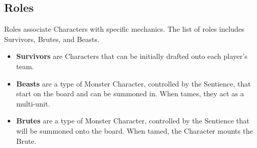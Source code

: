\documentclass[../main.tex]{subfiles}
\begin{document}
\subsection{Roles}
Roles associate Characters with specific mechanics. The list of roles includes Survivors, Brutes, and Beasts. 

\begin{itemize}
    \item \textbf{Survivors} are Characters that can be initially drafted onto each player's team. 
    \item \textbf{Beasts} are a type of Monster Character, controlled by the Sentience, that start on the board and can be summoned in. When tames, they act as a multi-unit. 
    \item \textbf{Brutes} are a type of Monster Character, controlled by the Sentience that will be summoned onto the board. When tamed, the Character mounts the Brute. 
\end{itemize}

\clearpage
\end{document}
